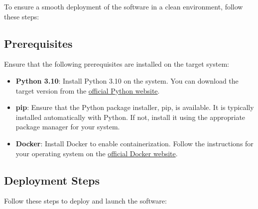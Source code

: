 \documentclass{scrartcl}
\begin{document}
To ensure a smooth deployment of the software in a clean environment, follow these steps:

\subsection{Prerequisites}

Ensure that the following prerequisites are installed on the target system:

\begin{itemize}
    \item \textbf{Python 3.10}: Install Python 3.10 on the system. You can download the target version from the \href{https://www.python.org/downloads/}{official Python website}.

    \item \textbf{pip}: Ensure that the Python package installer, pip, is available. It is typically installed automatically with Python. If not, install it using the appropriate package manager for your system.

    \item \textbf{Docker}: Install Docker to enable containerization. Follow the instructions for your operating system on the \href{https://docs.docker.com/get-docker/}{official Docker website}.

\end{itemize}

\subsection{Deployment Steps}

Follow these steps to deploy and launch the software:
\end{document}
